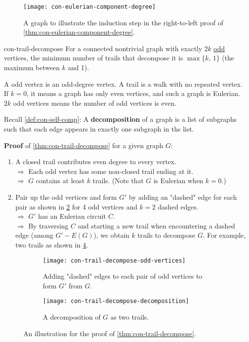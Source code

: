 \documentclass[../src/handouts/main.tex]{subfiles}
\begin{document}
\begin{figure}[htbp]
  \centering
  \texttt{[image: con-eulerian-component-degree]}
  \caption{A graph to illustrate the induction step in the right-to-left proof of \cref{thm:con-eulerian-component-degree}.}
  \label{fig:con-eulerian-component-degree}
\end{figure}

\begin{theorem}{}{con-trail-decompose}
  For a connected nontrivial graph with exactly $2 k$ \underline{odd} vertices, the minimum number of trails that decompose it is $\max \{k,\, 1\}$ (the maximum between $k$ and 1).
\end{theorem}

A odd vertex is an odd-degree vertex. A trail is a walk with no repeated vertex. If $k = 0$, it means a graph has only even vertices, and such a graph is Eulerian. $2 k$ odd vertices means the number of odd vertices is even.

Recall \cref{def:con-self-comp}: A \textbf{decomposition} of a graph is a list of subgraphs such that each edge appears in exactly one subgraph in ths list.

\textbf{Proof} of \cref{thm:con-trail-decompose} for a given graph $G$:
\begin{enumerate}
  \item A closed trail contributes even degree to every vertex.\\
    $\Rightarrow$ Each odd vertex has some non-closed trail ending at it.\\
    $\Rightarrow$ $G$ contains at least $k$ trails. (Note that $G$ is Eulerian when $k = 0$.)
  \item Pair up the odd vertices and form $G'$ by adding an "dashed" edge for each pair as shown in \cref{fig:con-trail-decompose-odd-vertices} for 4 odd vertices and $k = 2$ dashed edges.\\
    $\Rightarrow$ $G'$ has an Eulerian circuit $C$.\\
    $\Rightarrow$ By traversing $C$ and starting a new trail when encountering a dashed edge (among $G' - E(G)$), we obtain $k$ trails to decompose $G$. For example, two trails as shown in \cref{fig:con-trail-decompose-decomposition}.
\end{enumerate}

\begin{figure}[htbp]
  \centering
  \begin{subfigure}[t]{.45\textwidth}
    \centering
    \texttt{[image: con-trail-decompose-odd-vertices]}
    \caption{Adding "dashed" edges to each pair of odd vertices to form $G'$ from $G$.}
    \label{fig:con-trail-decompose-odd-vertices}
  \end{subfigure}
  \hfill
  \begin{subfigure}[t]{.45\textwidth}
    \centering
    \texttt{[image: con-trail-decompose-decomposition]}
    \caption{A decomposition of $G$ as two trails.}
    \label{fig:con-trail-decompose-decomposition}
  \end{subfigure}
  \caption{An illustration for the proof of \cref{thm:con-trail-decompose}.}
\end{figure}
\end{document}
